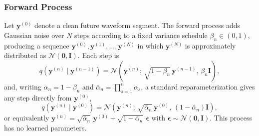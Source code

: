 \documentclass[lettersize,journal]{IEEEtran}
\begin{document}
\subsubsection{\textbf{Forward Process}}
Let $\mathbf{y}^{(0)}$ denote a clean future waveform segment. The forward
process adds Gaussian noise over $N$ steps according to a fixed variance
schedule $\beta_n \in (0,1)$, producing a sequence
$\mathbf{y}^{(0)}, \mathbf{y}^{(1)}, \ldots, \mathbf{y}^{(N)}$ in which
$\mathbf{y}^{(N)}$ is approximately distributed as
$\mathcal{N}(\mathbf{0}, \mathbf{I})$. Each step is
\begin{equation}
q\!\left(\mathbf{y}^{(n)} \mid \mathbf{y}^{(n-1)}\right)
= \mathcal{N}\!\left(\mathbf{y}^{(n)};\, \sqrt{1-\beta_n}\,\mathbf{y}^{(n-1)},\,
\beta_n \mathbf{I}\right),
\label{eq:forward_step}
\end{equation}
and, writing $\alpha_n = 1-\beta_n$ and
$\bar{\alpha}_n = \prod_{s=1}^{n}\alpha_s$, a standard reparameterization
gives any step directly from $\mathbf{y}^{(0)}$,
\begin{equation}
q\!\left(\mathbf{y}^{(n)} \mid \mathbf{y}^{(0)}\right)
= \mathcal{N}\!\left(\mathbf{y}^{(n)};\, \sqrt{\bar{\alpha}_n}\,\mathbf{y}^{(0)},\,
(1-\bar{\alpha}_n)\mathbf{I}\right),
\label{eq:forward_marginal}
\end{equation}
or equivalently $\mathbf{y}^{(n)} = \sqrt{\bar{\alpha}_n}\,\mathbf{y}^{(0)}
+ \sqrt{1-\bar{\alpha}_n}\,\boldsymbol{\epsilon}$ with
$\boldsymbol{\epsilon} \sim \mathcal{N}(\mathbf{0},\mathbf{I})$. This process
has no learned parameters.
\end{document}
